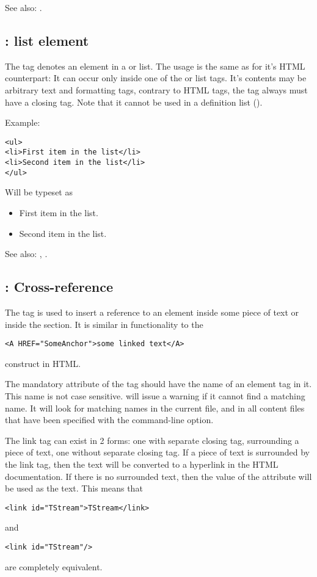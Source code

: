 See also: .

\subsection{ : list element}
\label{tag:li}
The tag  denotes an element in a  or  list.
The usage is the same as for it's HTML counterpart: It can occur 
only inside one of the   or  list tags.
It's contents may be arbitrary text and formatting tags, contrary to HTML
tags, the  tag always must have a closing tag. Note that it cannot be used in a
definition list ().

Example:
\begin{verbatim}
<ul>
<li>First item in the list</li>
<li>Second item in the list</li>
</ul>
\end{verbatim}
Will be typeset as
\begin{itemize}
\item First item in the list.
\item Second item in the list.
\end{itemize}

See also: , .

\subsection{ : Cross-reference}
\label{tag:link}
The  tag is used to insert a reference to an element inside some
piece of text or inside the  section. It is similar in
functionality to the 
\begin{verbatim}
<A HREF="SomeAnchor">some linked text</A>
\end{verbatim}
construct in HTML.

The mandatory  attribute of the  tag should have the 
name of an element tag in it. This name is not case sensitive. \fpdoc
will issue a warning if it cannot find a matching name. It will look for
matching names in the current file, and in all content files that have been
specified with the  command-line option.

The link tag can exist in 2 forms: one with separate closing tag,
surrounding a piece of text, one without separate closing tag. If a piece of
text is surrounded by the link tag, then the text will be converted to a
hyperlink in the HTML documentation. If there is no surrounded text, then
the value of the  attribute will be used as the text. This means
that
\begin{verbatim}
<link id="TStream">TStream</link>
\end{verbatim}
and
\begin{verbatim}
<link id="TStream"/>
\end{verbatim}
are completely equivalent.

